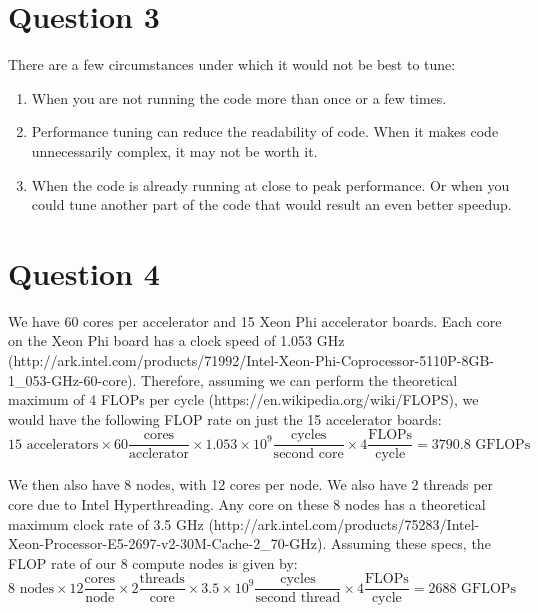 \documentclass[11pt]{article}
\begin{document}
    \section*{Question 3}
        There are a few circumstances under which it would not be best to tune:
        \begin{enumerate}
            \item When you are not running the code more than once or a few times.
            \item Performance tuning can reduce the readability of code. When it makes code unnecessarily complex, it may not be worth it.
            \item When the code is already running at close to peak performance. Or when you could tune another part of the code that would result an even better speedup.
        \end{enumerate}

    \section*{Question 4}
        We have 60 cores per accelerator and 15 Xeon Phi accelerator boards. Each core on the Xeon Phi board has a clock speed of 1.053 GHz (http://ark.intel.com/products/71992/Intel-Xeon-Phi-Coprocessor-5110P-8GB-1\_053-GHz-60-core). Therefore, assuming we can perform the theoretical maximum of 4 FLOPs per cycle (https://en.wikipedia.org/wiki/FLOPS), we would have the following FLOP rate on just the 15 accelerator boards:
        \begin{equation*}
            15 \text{ accelerators} \times 60 \frac{ \text{cores} }{ \text{acclerator} } \times 1.053\times 10^9 \frac{ \text{cycles} }{ \text{second core} } \times 4 \frac{ \text{FLOPs} }{\text{cycle} } = 3790.8 \text{ GFLOPs}
        \end{equation*}

        We then also have 8 nodes, with 12 cores per node. We also have 2 threads per core due to Intel Hyperthreading. Any core on these 8 nodes has a theoretical maximum clock rate of 3.5 GHz (http://ark.intel.com/products/75283/Intel-Xeon-Processor-E5-2697-v2-30M-Cache-2\_70-GHz). Assuming these specs, the FLOP rate of our 8 compute nodes is given by:
        \begin{equation*}
            8 \text{ nodes} \times 12 \frac{\text{cores}}{\text{node}} \times 2 \frac{\text{threads}}{\text{core}} \times 3.5\times 10^9 \frac{\text{cycles}}{\text{second thread}} \times 4 \frac{\text{FLOPs}}{\text{cycle}} = 2688 \text{ GFLOPs}
        \end{equation*}
\end{document}
